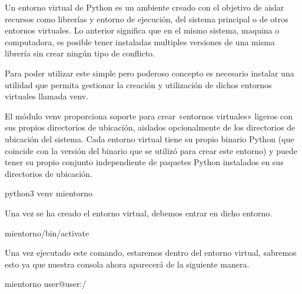 \documentclass[letterpaper,10pt,spanish]{sphinxmanual}
\begin{document}
\sphinxAtStartPar
Un entorno virtual de Python es un ambiente creado con el objetivo de aislar recursos como librerías y entorno de ejecución,
del sistema principal o de otros entornos virtuales. Lo anterior significa que en el mismo sistema, maquina o computadora,
es posible tener instaladas multiples versiones de una misma librería sin crear ningún tipo de conflicto.

\sphinxAtStartPar
Para poder utilizar este simple pero poderoso concepto es necesario instalar una utilidad que permita gestionar la creación
y utilización de dichos entornos virtuales llamada venv.

\sphinxAtStartPar
El módulo venv proporciona soporte para crear «entornos virtuales» ligeros con sus propios directorios de ubicación,
aislados opcionalmente de los directorios de ubicación del sistema. Cada entorno virtual tiene su propio binario Python
(que coincide con la versión del binario que se utilizó para crear este entorno) y puede tener su propio conjunto independiente
de paquetes Python instalados en sus directorios de ubicación.

\sphinxAtStartPar
{}

\begin{sphinxVerbatim}[commandchars=\\\{\}]

\PYGZdl{} python3 venv mientorno
\end{sphinxVerbatim}

\sphinxAtStartPar
Una vez se ha creado el entorno virtual, debemos entrar en dicho entorno.

\begin{sphinxVerbatim}[commandchars=\\\{\}]
\PYGZdl{}  mientorno/bin/activate
\end{sphinxVerbatim}

\sphinxAtStartPar
Una vez ejecutado este comando, estaremos dentro del entorno virtual, sabremos esto ya que nuestra consola
ahora aparecerá de la siguiente manera.

\begin{sphinxVerbatim}[commandchars=\\\{\}]
mientorno user@user:\PYGZti{}/
\end{sphinxVerbatim}
\end{document}
